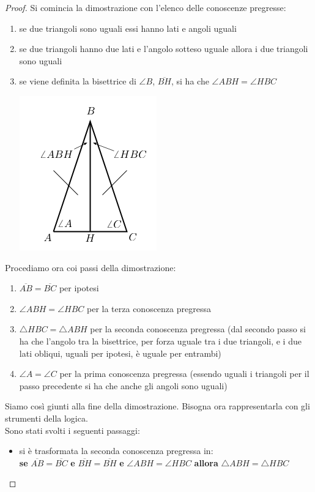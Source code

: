 \documentclass[a4paper,12pt, oneside]{book}
\begin{document}
\begin{proof}
Si comincia la dimostrazione con l'elenco delle conoscenze pregresse: 
\begin{enumerate}
\item se due triangoli sono uguali essi hanno lati e angoli uguali
\item se due triangoli hanno due lati e l'angolo sotteso uguale allora i due triangoli sono uguali
\item se viene definita la bisettrice di $\angle B$, $\overline{BH}$, si ha che $\angle ABH = \angle HBC$
\begin{center}
\includegraphics[scale=0.5]{img/tri2.png}
\end{center}
\end{enumerate}
Procediamo ora coi passi della dimostrazione:
\begin{enumerate}
\item $\overline{AB}=\overline{BC}$ per ipotesi
\item $\angle ABH = \angle HBC$ per la terza conoscenza pregressa
\item $\triangle HBC = \triangle ABH$ per la seconda conoscenza pregressa (dal secondo passo si ha che l'angolo tra la bisettrice, per forza uguale tra i due triangoli, e i due lati obliqui, uguali per ipotesi, è uguale per entrambi)
\item $\angle A= \angle C$ per la prima conoscenza pregressa (essendo uguali i triangoli per il passo precedente si ha che anche gli angoli sono uguali)
\end{enumerate}
Siamo così giunti alla fine della dimostrazione. Bisogna ora rappresentarla con gli strumenti della logica.\\
Sono stati svolti i seguenti passaggi:
\begin{itemize}
\item si è trasformata la seconda conoscenza pregressa in:\\\textbf{se} $\overline{AB}=\overline{BC}$ \textbf{e} $\overline{BH}=\overline{BH}$ \textbf{e} $\angle ABH = \angle HBC$ \textbf{allora} $\triangle ABH=\triangle HBC$

\end{itemize}
\end{proof}
\end{document}
